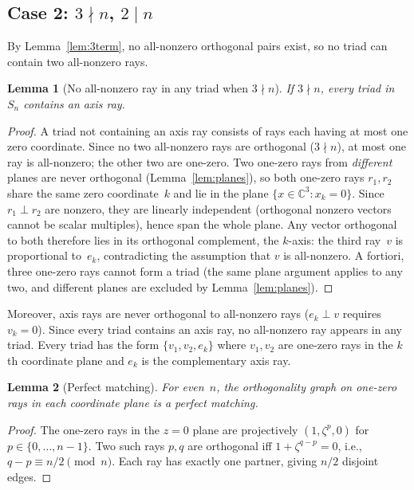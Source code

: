 \documentclass[twocolumn,prl,superscriptaddress,nofootinbib]{revtex4-2}
\newtheorem{lemma}{Lemma}
\newcommand{\C}{\mathbb{C}}
\begin{document}
\subsection{Case 2: $3 \nmid n$, $2 \mid n$}

By Lemma~\ref{lem:3term}, no all-nonzero orthogonal pairs exist, so no triad can contain two all-nonzero rays.

\begin{lemma}[No all-nonzero ray in any triad when $3 \nmid n$]\label{lem:noallnonzero}
If $3 \nmid n$, every triad in $S_n$ contains an axis ray.
\end{lemma}

\begin{proof}
A triad not containing an axis ray consists of rays each having at most one zero coordinate.  Since no two all-nonzero rays are orthogonal ($3 \nmid n$), at most one ray is all-nonzero; the other two are one-zero.  Two one-zero rays from \emph{different} planes are never orthogonal (Lemma~\ref{lem:planes}), so both one-zero rays $r_1, r_2$ share the same zero coordinate~$k$ and lie in the plane $\{x \in \C^3 : x_k = 0\}$.  Since $r_1 \perp r_2$ are nonzero, they are linearly independent (orthogonal nonzero vectors cannot be scalar multiples), hence span the whole plane.  Any vector orthogonal to both therefore lies in its orthogonal complement, the $k$-axis: the third ray~$v$ is proportional to~$e_k$, contradicting the assumption that $v$ is all-nonzero.  A fortiori, three one-zero rays cannot form a triad (the same plane argument applies to any two, and different planes are excluded by Lemma~\ref{lem:planes}).
\end{proof}

Moreover, axis rays are never orthogonal to all-nonzero rays ($e_k \perp v$ requires $v_k = 0$).  Since every triad contains an axis ray, no all-nonzero ray appears in any triad.  Every triad has the form $\{v_1, v_2, e_k\}$ where $v_1, v_2$ are one-zero rays in the $k$th coordinate plane and $e_k$ is the complementary axis ray.

\begin{lemma}[Perfect matching]\label{lem:matching}
For even~$n$, the orthogonality graph on one-zero rays in each coordinate plane is a perfect matching.
\end{lemma}

\begin{proof}
The one-zero rays in the $z = 0$ plane are projectively $(1, \zeta^p, 0)$ for $p \in \{0, \ldots, n-1\}$.  Two such rays $p, q$ are orthogonal iff $1 + \zeta^{q-p} = 0$, i.e., $q - p \equiv n/2 \pmod{n}$.  Each ray has exactly one partner, giving $n/2$ disjoint edges.
\end{proof}
\end{document}
